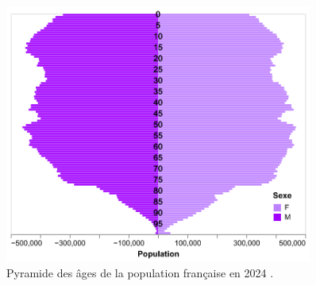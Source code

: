 \begin{figure}[H]
\centering
\includegraphics[width=0.9\textwidth]{images/2_chapitres/chapitre3/pyramide_age.png}
\caption{Pyramide des âges de la population française en 2024 \cite{pyramide_age}.}
\label{fig:pyramide_age}
\end{figure}